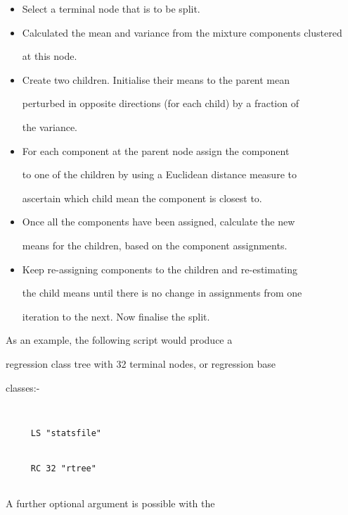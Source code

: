\begin{itemize}


\item Select a terminal node that is to be split.


\item Calculated the mean and variance from the mixture components clustered


at this node.


\item Create two children. Initialise their means to the parent mean 


perturbed in opposite directions (for each child) by a fraction of 


the variance.


\item For each component at the parent node assign the component 


to one of the children by using a Euclidean distance measure to 


ascertain which child mean the component is closest to.


\item Once all the components have been assigned, calculate the new


means for the children, based on the component assignments.


\item Keep re-assigning components to the children and re-estimating


the child means until there is no change in assignments from one


iteration to the next. Now finalise the split.


\end{itemize}





As an example, the following  script would produce a 


regression class tree with 32 terminal nodes, or regression base


classes:-


\begin{verbatim}


     LS "statsfile"


     RC 32 "rtree"


\end{verbatim}





A further optional argument is possible with the 


